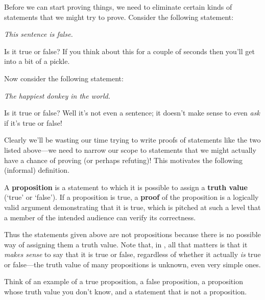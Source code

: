 
Before we can start proving things, we need to eliminate certain kinds of statements that we might try to prove. Consider the following statement:

\begin{center}
\textit{This sentence is false.}
\end{center}

Is it true or false? If you think about this for a couple of seconds then you'll get into a bit of a pickle.

Now consider the following statement:

\begin{center}
\textit{The happiest donkey in the world.}
\end{center}

Is it true or false? Well it's not even a sentence; it doesn't make sense to even \textit{ask} if it's true or false!

Clearly we'll be wasting our time trying to write proofs of statements like the two listed above---we need to narrow our scope to statements that we might actually have a chance of proving (or perhaps refuting)! This motivates the following (informal) definition.

\begin{definition}
\label{defProposition}
\label{defProof}
A \textbf{proposition}  is a statement to which it is possible to assign a \textbf{truth value} (`true' or `false'). If a proposition is true, a \textbf{proof} of the proposition is a logically valid argument demonstrating that it is true, which is pitched at such a level that a member of the intended audience can verify its correctness.
\end{definition}

Thus the statements given above are not propositions because there is no possible way of assigning them a truth value. Note that, in , all that matters is that it \textit{makes sense} to say that it is true or false, regardless of whether it actually \textit{is} true or false---the truth value of many propositions is unknown, even very simple ones.

\begin{exercise}
Think of an example of a true proposition, a false proposition, a proposition whose truth value you don't know, and a statement that is not a proposition.
\end{exercise}

